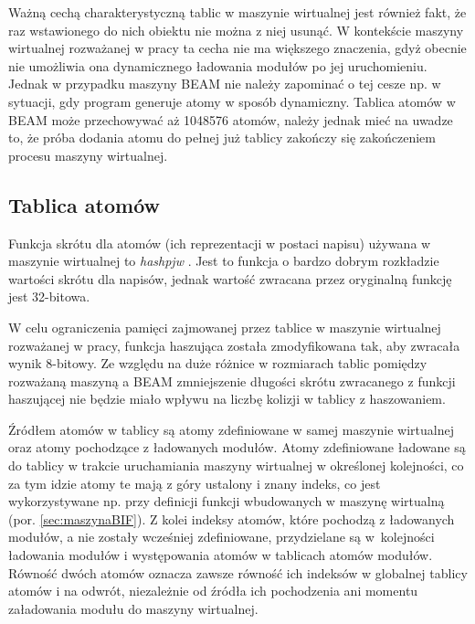 Ważną cechą charakterystyczną tablic w maszynie wirtualnej jest również fakt, że raz wstawionego do nich obiektu nie można z niej usunąć. W kontekście maszyny wirtualnej rozważanej w pracy ta cecha nie ma większego znaczenia, gdyż obecnie nie umożliwia ona dynamicznego ładowania modułów po jej uruchomieniu. Jednak w przypadku maszyny BEAM nie należy zapominać o tej cesze np. w sytuacji, gdy program generuje atomy w sposób dynamiczny. Tablica atomów w BEAM może przechowywać aż 1048576 atomów, należy jednak mieć na uwadze to, że próba dodania atomu do pełnej już tablicy zakończy się zakończeniem procesu maszyny wirtualnej.

\subsection{Tablica atomów}
\label{sub:maszynaTablicaAtomow}

Funkcja skrótu dla atomów (ich reprezentacji w postaci napisu) używana w maszynie wirtualnej to \emph{hashpjw} \cite{Aho1986}. Jest to funkcja o bardzo dobrym rozkładzie wartości skrótu dla napisów, jednak wartość zwracana przez oryginalną funkcję jest 32-bitowa.

W celu ograniczenia pamięci zajmowanej przez tablice w maszynie wirtualnej rozważanej w pracy, funkcja haszująca została zmodyfikowana tak, aby zwracała wynik 8-bitowy. Ze względu na duże różnice w rozmiarach tablic pomiędzy rozważaną maszyną a BEAM zmniejszenie długości skrótu zwracanego z funkcji haszującej nie będzie miało wpływu na liczbę kolizji w tablicy z haszowaniem. 

Źródłem atomów w tablicy są atomy zdefiniowane w samej maszynie wirtualnej oraz atomy pochodzące z ładowanych modułów. Atomy zdefiniowane ładowane są do tablicy w trakcie uruchamiania maszyny wirtualnej w określonej kolejności, co za tym idzie atomy te mają z góry ustalony i znany indeks, co jest wykorzystywane np. przy definicji funkcji wbudowanych w maszynę wirtualną (por. \ref{sec:maszynaBIF}). Z kolei indeksy atomów, które pochodzą z ładowanych modułów, a nie zostały wcześniej zdefiniowane, przydzielane są w~kolejności ładowania modułów i występowania atomów w tablicach atomów modułów. Równość dwóch atomów oznacza zawsze równość ich indeksów w globalnej tablicy atomów i na odwrót, niezależnie od źródła ich pochodzenia ani momentu załadowania modułu do maszyny wirtualnej.


